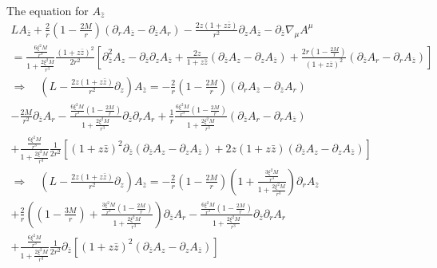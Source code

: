 \documentclass[12pt]{article}
\def\nn{\nonumber}
\begin{document}
The equation for $A_{\bar{z}}$
\begin{gather}
L A_{\bar{z}}
+
\frac{2}{r}
(1 - \frac{2 M}{r})
(\partial_{r} A_{\bar{z}} - \partial_{\bar{z}} A_{r})
-
\frac{2 z (1 + z \bar{z})}{r^{2}}
\partial_{z}
A_{\bar{z}}
-
\partial_{\bar{z}}
\nabla_{\mu}
A^{\mu}
\nn \\
=
\frac{\frac{6 \xi^{2} M}{r^{3}} }{1 + \frac{2 \xi^{2} M}{r^{3}}}
\frac{(1 + z \bar{z})^{2}}{2 r^{2}}
\left[
\partial_{\bar{z}}^{2}A_{z}
-
\partial_{\bar{z}} \partial_{z} A_{\bar{z}}
+
\frac{2 z}{1 + z \bar{z}}
(\partial_{\bar{z}} A_{z}
-
\partial_{z} A_{\bar{z}})
+
\frac{2 r (1 - \frac{2 M}{r})}{(1 + z \bar{z})^{2}}
(\partial_{\bar{z}} A_{r}
-
\partial_{r} A_{\bar{z}})
\right]
\nn \\
\Rightarrow
\quad
\left(L
-
\frac{2 z (1 + z \bar{z})}{r^{2}}
\partial_{z}
\right)
A_{\bar{z}}
=
-
\frac{2}{r}
(1 - \frac{2 M}{r})
(\partial_{r} A_{\bar{z}} - \partial_{\bar{z}} A_{r})
\nn \\
-
\frac{2 M}{r^{2}}
\partial_{\bar{z}}
A_{r}
-
\frac{\frac{6 \xi^{2} M}{r^{3}} (1 - \frac{2 M}{r})}{1 + \frac{2 \xi^{2} M}{r^{3}}}
\partial_{\bar{z}}
\partial_{r}
A_{r}
+
\frac{1}{r}
\frac{\frac{6 \xi^{2} M}{r^{3}} (1 - \frac{2 M}{r}) }{1 + \frac{2 \xi^{2} M}{r^{3}}}
(\partial_{\bar{z}} A_{r}
-
\partial_{r} A_{\bar{z}})
\nn \\
+
\frac{\frac{6 \xi^{2} M}{r^{3}} }{1 + \frac{2 \xi^{2} M}{r^{3}}}
\frac{1}{2 r^{2}}
\left[
(1 + z \bar{z})^{2}
\partial_{\bar{z}}
\left(
\partial_{\bar{z}}A_{z}
-
\partial_{z} A_{\bar{z}}
\right)
+
2 z
(1 + z \bar{z})
(\partial_{\bar{z}} A_{z}
-
\partial_{z} A_{\bar{z}})
\right]
\nn \\
\Rightarrow
\quad
\left(L
-
\frac{2 z (1 + z \bar{z})}{r^{2}}
\partial_{z}
\right)
A_{\bar{z}}
=
-
\frac{2}{r}
(1 - \frac{2 M}{r})
\left(
1
+
\frac{\frac{3 \xi^{2} M}{r^{3}} }{1 + \frac{2 \xi^{2} M}{r^{3}}}
\right)
\partial_{r} A_{\bar{z}}
\nn \\
+
\frac{2}{r}
\left(
(
1
- 
\frac{3 M}{r})
+
\frac{\frac{3 \xi^{2} M}{r^{3}} (1 - \frac{2 M}{r}) }{1 + \frac{2 \xi^{2} M}{r^{3}}}
\right)
\partial_{\bar{z}} A_{r}
-
\frac{\frac{6 \xi^{2} M}{r^{3}} (1 - \frac{2 M}{r})}{1 + \frac{2 \xi^{2} M}{r^{3}}}
\partial_{\bar{z}}
\partial_{r}
A_{r}
\nn \\
+
\frac{\frac{6 \xi^{2} M}{r^{3}} }{1 + \frac{2 \xi^{2} M}{r^{3}}}
\frac{1}{2 r^{2}}
\partial_{\bar{z}}
\left[
(1 + z \bar{z})^{2}
\left(
\partial_{\bar{z}}A_{z}
-
\partial_{z} A_{\bar{z}}
\right)
\right]
\end{gather}
\end{document}
